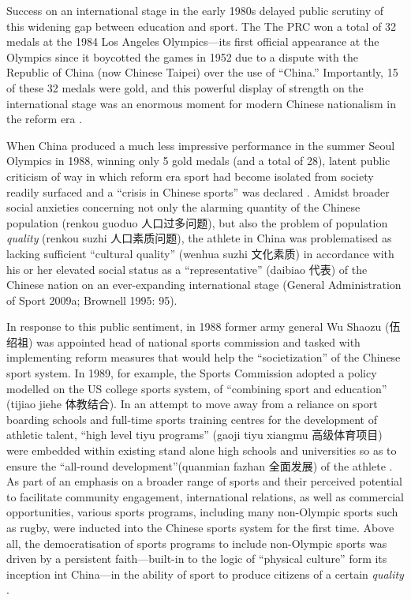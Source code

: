 {Success on an international stage in the early 1980s delayed public scrutiny of this widening gap between education and sport. The The PRC won a total of 32 medals at the 1984 Los Angeles Olympics---its first official appearance at the Olympics since it boycotted the games in 1952 due to a dispute with the Republic of China (now Chinese Taipei) over the use of ``China.''  Importantly, 15 of these 32 medals were gold, and this powerful display of strength on the international stage was an enormous moment for modern Chinese nationalism in the reform era \citep{Brownell2008}.

When China produced a much less impressive performance in the summer Seoul Olympics in 1988, winning only 5 gold medals (and a total of 28), latent public criticism of way in which reform era sport had become isolated from society readily surfaced and a ``crisis in Chinese sports'' was declared \citep[199]{Brownell1995}.  Amidst broader social anxieties concerning not only the alarming quantity of the Chinese population (renkou guoduo 人口过多问题), but also the problem of population \textit{quality} (renkou suzhi 人口素质问题), the athlete in China was problematised as lacking sufficient ``cultural quality'' (wenhua suzhi 文化素质) in accordance with his or her elevated social status as a ``representative'' (daibiao 代表) of the Chinese nation on an ever-expanding international stage (General Administration of Sport 2009a; Brownell 1995: 95).

In response to this public sentiment, in 1988 former army general Wu Shaozu (伍绍祖) was appointed head of national sports commission and tasked with implementing reform measures that would help the ``societization'' of the Chinese sport system. In 1989, for example, the Sports Commission adopted a policy modelled on the US college sports system, of ``combining sport and education'' (tijiao jiehe 体教结合).  In an attempt to move away from a reliance on sport boarding schools and full-time sports training centres for the development of athletic talent, ``high level tiyu programs'' (gaoji tiyu xiangmu 高级体育项目) were embedded within existing stand alone high schools and universities so as to ensure the ``all-round development''(quanmian fazhan 全面发展) of the athlete \citep[203]{Brownell1995}.  As part of an emphasis on a broader range of sports and their perceived potential to facilitate community engagement, international relations, as well as commercial opportunities, various sports programs, including many non-Olympic sports such as rugby, were inducted into the Chinese sports system for the first time\citep[70]{Knuttgen1990}.  Above all, the  democratisation of sports programs to include non-Olympic sports was driven by a persistent faith---built-in to the logic of ``physical culture'' form its inception int China---in the ability of sport to produce citizens of a certain \textit{quality} \citep[7]{Woronov2003}.

}
